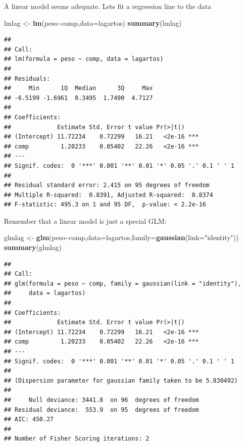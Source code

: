 \documentclass[
]{book}
\newenvironment{Shaded}{\begin{snugshade}}{\end{snugshade}}
\newcommand{\AttributeTok}[1]{\textcolor[rgb]{0.13,0.29,0.53}{#1}}
\newcommand{\FunctionTok}[1]{\textcolor[rgb]{0.13,0.29,0.53}{\textbf{#1}}}
\newcommand{\NormalTok}[1]{#1}
\newcommand{\OtherTok}[1]{\textcolor[rgb]{0.56,0.35,0.01}{#1}}
\newcommand{\SpecialCharTok}[1]{\textcolor[rgb]{0.81,0.36,0.00}{\textbf{#1}}}
\newcommand{\StringTok}[1]{\textcolor[rgb]{0.31,0.60,0.02}{#1}}
\begin{document}
A linear model seems adequate. Lets fit a regression line to the data

\begin{Shaded}
\begin{Highlighting}[]
\NormalTok{lmlag }\OtherTok{\textless{}{-}} \FunctionTok{lm}\NormalTok{(peso}\SpecialCharTok{\textasciitilde{}}\NormalTok{comp,}\AttributeTok{data=}\NormalTok{lagartos)}
\FunctionTok{summary}\NormalTok{(lmlag)}
\end{Highlighting}
\end{Shaded}

\begin{verbatim}
## 
## Call:
## lm(formula = peso ~ comp, data = lagartos)
## 
## Residuals:
##     Min      1Q  Median      3Q     Max 
## -6.5199 -1.6961  0.3495  1.7490  4.7127 
## 
## Coefficients:
##             Estimate Std. Error t value Pr(>|t|)    
## (Intercept) 11.72234    0.72299   16.21   <2e-16 ***
## comp         1.20233    0.05402   22.26   <2e-16 ***
## ---
## Signif. codes:  0 '***' 0.001 '**' 0.01 '*' 0.05 '.' 0.1 ' ' 1
## 
## Residual standard error: 2.415 on 95 degrees of freedom
## Multiple R-squared:  0.8391, Adjusted R-squared:  0.8374 
## F-statistic: 495.3 on 1 and 95 DF,  p-value: < 2.2e-16
\end{verbatim}

Remember that a linear model is just a special GLM:

\begin{Shaded}
\begin{Highlighting}[]
\NormalTok{glmlag }\OtherTok{\textless{}{-}} \FunctionTok{glm}\NormalTok{(peso}\SpecialCharTok{\textasciitilde{}}\NormalTok{comp,}\AttributeTok{data=}\NormalTok{lagartos,}\AttributeTok{family=}\FunctionTok{gaussian}\NormalTok{(}\AttributeTok{link=}\StringTok{"identity"}\NormalTok{))}
\FunctionTok{summary}\NormalTok{(glmlag)}
\end{Highlighting}
\end{Shaded}

\begin{verbatim}
## 
## Call:
## glm(formula = peso ~ comp, family = gaussian(link = "identity"), 
##     data = lagartos)
## 
## Coefficients:
##             Estimate Std. Error t value Pr(>|t|)    
## (Intercept) 11.72234    0.72299   16.21   <2e-16 ***
## comp         1.20233    0.05402   22.26   <2e-16 ***
## ---
## Signif. codes:  0 '***' 0.001 '**' 0.01 '*' 0.05 '.' 0.1 ' ' 1
## 
## (Dispersion parameter for gaussian family taken to be 5.830492)
## 
##     Null deviance: 3441.8  on 96  degrees of freedom
## Residual deviance:  553.9  on 95  degrees of freedom
## AIC: 450.27
## 
## Number of Fisher Scoring iterations: 2
\end{verbatim}
\end{document}
